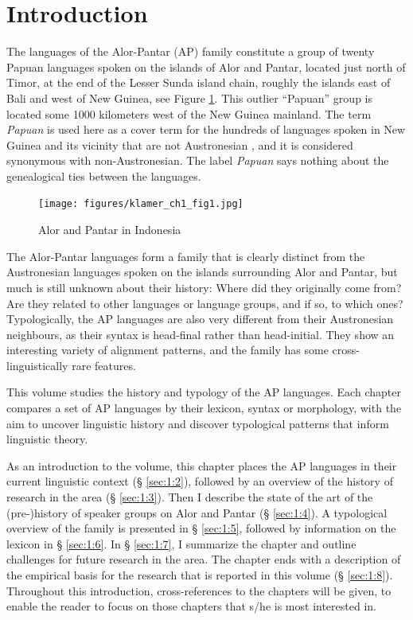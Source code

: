 
\section{Introduction}\label{sec:1:1}

The languages of the Alor-Pantar (AP) family constitute a group of twenty Papuan languages spoken on the islands of Alor and Pantar, located just north of Timor, at the end of the Lesser Sunda island chain, roughly the islands east of Bali and west of New Guinea, see Figure \ref{fig:1:Map1}. This outlier ``Papuan'' group is located some 1000 kilometers west of the New Guinea mainland. The term \textit{Papuan} is used here as a cover term for the hundreds of languages spoken in New Guinea and its vicinity that are not Austronesian \citep[15]{Ross2005}, and it is considered synonymous with non-Austronesian. The label \textit{Papuan} says nothing about the genealogical ties between the languages. 

\begin{figure}[t]
 \texttt{[image: figures/klamer\_ch1\_fig1.jpg]}
\caption{Alor and Pantar in Indonesia}
\label{fig:1:Map1}
\end{figure}  


The Alor-Pantar languages form a family that is clearly distinct from the Austronesian languages spoken on the islands surrounding Alor and Pantar, but much is still unknown about their history: Where did they originally come from? Are they related to other languages or language groups, and if so, to which ones? Typologically, the AP languages are also very different from their Austronesian neighbours, as their syntax is head-final rather than head-initial. They show an interesting variety of alignment patterns, and the family has some cross-linguistically rare features.  

This volume studies the history and typology of the AP languages. Each chapter compares a set of AP languages by their lexicon, syntax or morphology, with the aim to uncover linguistic history and discover typological patterns that inform linguistic theory. 

As an introduction to the volume, this chapter places the AP languages in their current linguistic context ({\S{}} \ref{sec:1:2}), followed by an overview of the history of research in the area ({\S{}} \ref{sec:1:3}). Then I describe the state of the art of the (pre-)history of speaker groups on Alor and Pantar ({\S{}} \ref{sec:1:4}). A typological overview of the family is presented in {\S{}} \ref{sec:1:5}, followed by information on the lexicon in {\S{}} \ref{sec:1:6}. In {\S{}} \ref{sec:1:7}, I summarize the chapter and outline challenges for future research in the area. The chapter ends with a description of the empirical basis for the research that is reported in this volume ({\S{}} \ref{sec:1:8}). Throughout this introduction, cross-references to the chapters will be given, to enable the reader to focus on those chapters that s/he is most interested in. 





